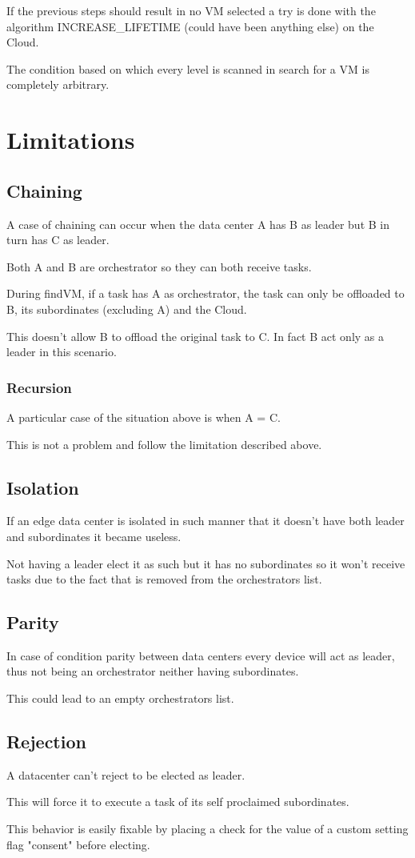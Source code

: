 \documentclass[12pt, a4paper]{report} %
\begin{document}
If the previous steps should result in no VM selected a try is done with the algorithm INCREASE\_LIFETIME (could have been anything else) on the Cloud.

The condition based on which every level is scanned in search for a VM is completely arbitrary.

\section*{Limitations}

\subsection*{Chaining}
A case of chaining can occur when the data center A has B as leader but B in turn has C as leader.

Both A and B are orchestrator so they can both receive tasks.

During findVM, if a task has A as orchestrator, the task can only be offloaded to B, its subordinates (excluding A) and the Cloud.

This doesn't allow B to offload the original task to C. In fact B act only as a leader in this scenario.

\subsubsection*{Recursion}
A particular case of the situation above is when A = C.

This is not a problem and follow the limitation described above.


\subsection*{Isolation}
If an edge data center is isolated in such manner that it doesn't have both leader and subordinates it became useless.

Not having a leader elect it as such but it has no subordinates so it won't receive tasks due to the fact that is removed from the orchestrators list.

\subsection*{Parity}
In case of condition parity between data centers every device will act as leader, thus not being an orchestrator neither having subordinates.

This could lead to an empty orchestrators list.

\subsection*{Rejection}
A datacenter can't reject to be elected as leader. 

This will force it to execute a task of its self proclaimed subordinates.

This behavior is easily fixable by placing a check for the value of a custom setting flag "consent" before electing.
\end{document}
